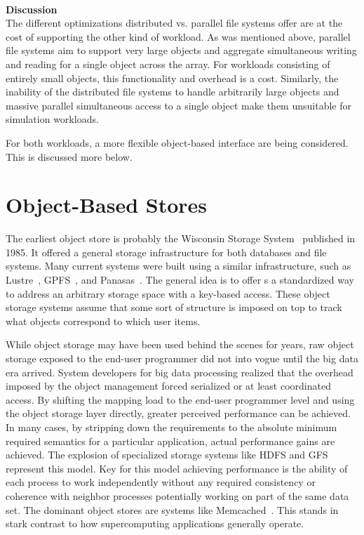 ~\\
\noindent\textbf{Discussion}\\
The different optimizations distributed vs. parallel file systems offer are at
the cost of supporting the other kind of workload. As was mentioned above,
parallel file systems aim to support very large objects and aggregate
simultaneous writing and reading for a single object across the array. For
workloads consisting of entirely small objects, this functionality and overhead
is a cost. Similarly, the inability of the distributed file systems to handle
arbitrarily large objects and massive parallel simultaneous access to a single
object make them unsuitable for simulation workloads.

For both workloads, a more flexible object-based interface are being
considered. This is discussed more below.

\section{Object-Based Stores}\label{sec:intro}

The earliest object store is probably the Wisconsin Storage
System~\cite{1985:chou:wisconsin-storage} published in 1985. It offered a
general storage infrastructure for both databases and file systems. Many
current systems were built using a similar infrastructure, such as
Lustre~\cite{braam:2002:lustre-arch}, GPFS~\cite{schmuck:2002:gpfs}, and
Panasas~\cite{welch:2008:panasas}. The general idea is to offer s a
standardized way to address an arbitrary storage space with a key-based access.
These object storage systems assume that some sort of structure is imposed on
top to track what objects correspond to which user items.

While object storage may have been used behind the scenes for years, raw
object storage exposed to the end-user programmer did not into vogue until the
big data era arrived. System developers for big data processing realized that
the overhead imposed by the object management forced serialized or at least
coordinated access. By shifting the mapping load to the end-user programmer
level and using the object storage layer directly, greater perceived
performance can be achieved. In many cases, by stripping down the requirements
to the absolute minimum required semantics for a particular application,
actual performance gains are achieved. The explosion of specialized storage
systems like HDFS and GFS represent this model. Key for this model achieving
performance is the ability of each process to work independently without any
required consistency or coherence with neighbor processes potentially working
on part of the same data set. The dominant object stores are systems like
Memcached~\cite{fitzpatrick:2004:memcached}. This stands in stark contrast to
how supercomputing applications generally operate.

